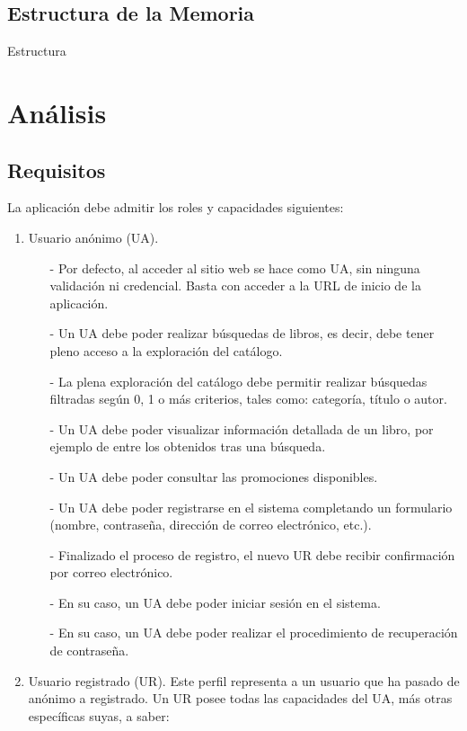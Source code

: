 \documentclass[a4paper]{article}
\begin{document}
    \subsection{Estructura de la Memoria}
    Estructura

    \section{Análisis}
        \subsection{Requisitos}
            La aplicación debe admitir los roles y capacidades siguientes:
            \begin{enumerate}
                \item Usuario anónimo (UA).
                \begin{itemize}
                    \item[-] Por defecto, al acceder al sitio web se hace como UA, sin ninguna validación ni credencial. Basta con acceder a la URL de inicio de la aplicación.
                    \item[-] Un UA debe poder realizar búsquedas de libros, es decir, debe tener pleno acceso a la exploración del catálogo.
                    \item[-] La plena exploración del catálogo debe permitir realizar búsque\-das filtradas según 0, 1 o más criterios, tales como: categoría, título o autor.
                    \item[-] Un UA debe poder visualizar información detallada de un libro, por ejemplo de entre los obtenidos tras una búsqueda.
                    \item[-] Un UA debe poder consultar las promociones disponibles.
                    \item[-] Un UA debe poder registrarse en el sistema completando un formulario (nombre, contraseña, dirección de correo electrónico, etc.).
                    \item[-] Finalizado el proceso de registro, el nuevo UR debe recibir confirmación por correo electrónico.
                    \item[-] En su caso, un UA debe poder iniciar sesión en el sistema.
                    \item[-] En su caso, un UA debe poder realizar el procedimiento de recuperación de contraseña.
                \end{itemize}
                \item Usuario registrado (UR). Este perfil representa a un usuario que ha pasado de anónimo a registrado. Un UR posee todas las capacidades del UA, más otras específicas suyas, a saber:

\end{enumerate}
\end{document}
